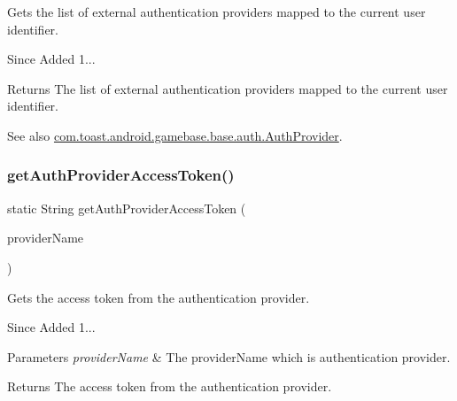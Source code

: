 Gets the list of external authentication providers mapped to the current user identifier. 

\begin{DoxySince}{Since}
Added 1... 
\end{DoxySince}
\begin{DoxyReturn}{Returns}
The list of external authentication providers mapped to the current user identifier. 
\end{DoxyReturn}
\begin{DoxySeeAlso}{See also}
\hyperlink{interfacecom_1_1toast_1_1android_1_1gamebase_1_1base_1_1auth_1_1_auth_provider}{com.\+toast.\+android.\+gamebase.\+base.\+auth.\+Auth\+Provider}. 
\end{DoxySeeAlso}
\mbox{\label{classcom_1_1toast_1_1android_1_1gamebase_1_1_gamebase_ae2f90bca5deb4d7dff72b890a257814f}} 
\subsubsection{\texorpdfstring{get\+Auth\+Provider\+Access\+Token()}{getAuthProviderAccessToken()}}
{\footnotesize\ttfamily static String get\+Auth\+Provider\+Access\+Token (\begin{DoxyParamCaption}\item[{@Non\+Null String}]{provider\+Name }\end{DoxyParamCaption})\hspace{0.3cm}{\ttfamily [static]}}



Gets the access token from the authentication provider. 

\begin{DoxySince}{Since}
Added 1... 
\end{DoxySince}

\begin{DoxyParams}{Parameters}
{\em provider\+Name} & The provider\+Name which is authentication provider. \\
\hline
\end{DoxyParams}
\begin{DoxyReturn}{Returns}
The access token from the authentication provider. 
\end{DoxyReturn}
\mbox{\label{classcom_1_1toast_1_1android_1_1gamebase_1_1_gamebase_abfa260ed922444ef35f23f8ac847b4f8}} 

